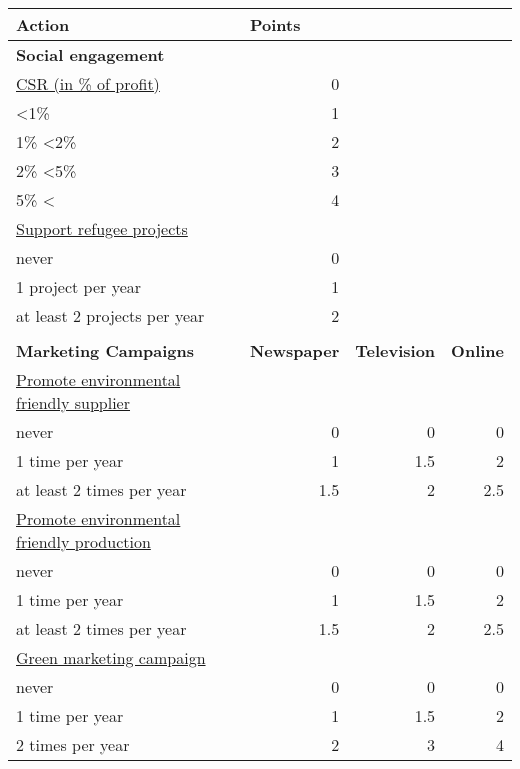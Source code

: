 \begin{table}[]
\begin{tabular}{|l|r|r|r|}
\hline
\multicolumn{1}{|l|}{\textbf{Action}}             & \multicolumn{1}{l|}{\textbf{Points}} & \multicolumn{1}{l|}{}       & \multicolumn{1}{l|}{}   \\ \hline
\textbf{Social engagement}        &       &       &  \\
\underline{CSR (in \% of profit)} & 0     &       &  \\
\textless 1\%                     & 1     &       &  \\
1\% \textless 2\%                 & 2     &       &  \\
2\% \textless 5\%                 & 3     &       &  \\
5\% \textless{}                   & 4     &       &  \\
\underline{Support refugee projects}  &   &       &  \\
never                             & 0     &       &  \\
1 project per year                & 1     &       &  \\
at least 2 projects per year      & 2     &       &  \\
&  &  &  \\ \hline
\textbf{Marketing Campaigns}  & \textbf{Newspaper} & \textbf{Television} & \textbf{Online} \\ \hline
\underline{Promote environmental friendly supplier}   & & & \\
never                             & 0    & 0      & 0 \\
1 time per year                   & 1    & 1.5    & 2 \\
at least 2 times per year         & 1.5  & 2      & 2.5 \\
\underline{Promote environmental friendly production} & & & \\
never                             & 0    & 0      & 0 \\
1 time per year                   & 1    & 1.5    & 2 \\
at least 2 times per year         & 1.5  & 2      & 2.5 \\
\underline{Green marketing campaign} & & & \\
never                             & 0    & 0      & 0 \\
1 time per year                   & 1    & 1.5    & 2 \\
2 times per year                  & 2    & 3      & 4 \\

\end{tabular}
\end{table}
